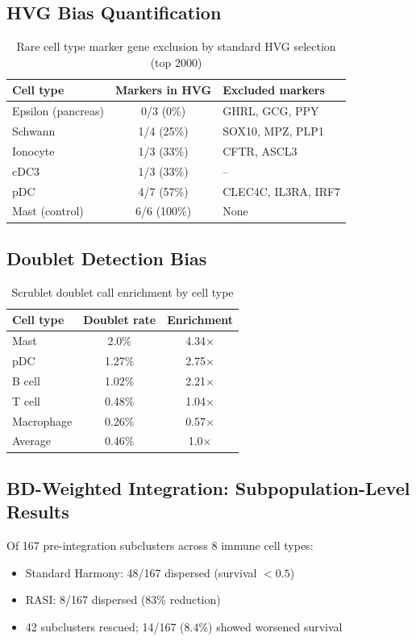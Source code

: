 \documentclass[10pt]{article}
\begin{document}
\subsection{HVG Bias Quantification}

\begin{table}[H]
\centering
\caption{Rare cell type marker gene exclusion by standard HVG selection (top 2000)}
\begin{tabular}{lcl}
\toprule
Cell type & Markers in HVG & Excluded markers \\
\midrule
Epsilon (pancreas) & 0/3 (0\%) & GHRL, GCG, PPY \\
Schwann & 1/4 (25\%) & SOX10, MPZ, PLP1 \\
Ionocyte & 1/3 (33\%) & CFTR, ASCL3 \\
cDC3 & 1/3 (33\%) & -- \\
pDC & 4/7 (57\%) & CLEC4C, IL3RA, IRF7 \\
Mast (control) & 6/6 (100\%) & None \\
\bottomrule
\end{tabular}
\end{table}

\subsection{Doublet Detection Bias}

\begin{table}[H]
\centering
\caption{Scrublet doublet call enrichment by cell type}
\begin{tabular}{lcc}
\toprule
Cell type & Doublet rate & Enrichment \\
\midrule
Mast & 2.0\% & 4.34$\times$ \\
pDC & 1.27\% & 2.75$\times$ \\
B cell & 1.02\% & 2.21$\times$ \\
T cell & 0.48\% & 1.04$\times$ \\
Macrophage & 0.26\% & 0.57$\times$ \\
\midrule
Average & 0.46\% & 1.0$\times$ \\
\bottomrule
\end{tabular}
\end{table}

\subsection{BD-Weighted Integration: Subpopulation-Level Results}

Of 167 pre-integration subclusters across 8 immune cell types:
\begin{itemize}
\item Standard Harmony: 48/167 dispersed (survival $< 0.5$)
\item RASI: 8/167 dispersed (83\% reduction)
\item 42 subclusters rescued; 14/167 (8.4\%) showed worsened survival
\end{itemize}
\end{document}
